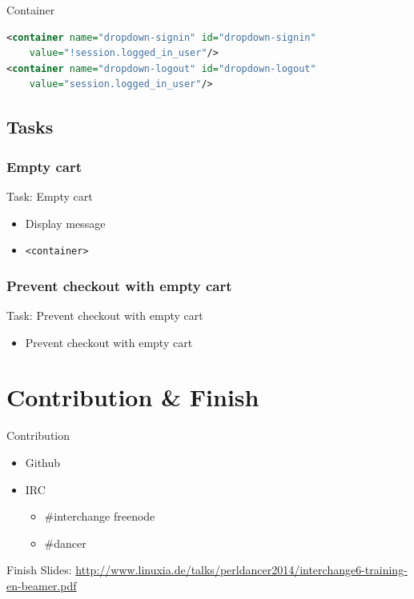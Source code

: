 \begin{frame}[fragile]{Container}
\begin{lstlisting}[language=xml]
<container name="dropdown-signin" id="dropdown-signin" 
    value="!session.logged_in_user"/>
<container name="dropdown-logout" id="dropdown-logout" 
    value="session.logged_in_user"/>
\end{lstlisting}
\end{frame}

\subsection{Tasks}
\subsubsection{Empty cart}
\begin{frame}[fragile]{Task: Empty cart}
\begin{itemize}
\item Display message 
\item \verb|<container>|
\end{itemize}
\end{frame}

\subsubsection{Prevent checkout with empty cart}
\begin{frame}{Task: Prevent checkout with empty cart}
\begin{itemize}
\item Prevent checkout with empty cart
\end{itemize}
\end{frame}

\section{Contribution \& Finish}
\begin{frame}{Contribution}
\begin{itemize}
\item Github
\item IRC 
\begin{itemize}
\item \#interchange freenode
\item \#dancer
\end{itemize}
\end{itemize}
\end{frame}

\begin{frame}{Finish}
Slides:
\url{http://www.linuxia.de/talks/perldancer2014/interchange6-training-en-beamer.pdf}
\end{frame}



